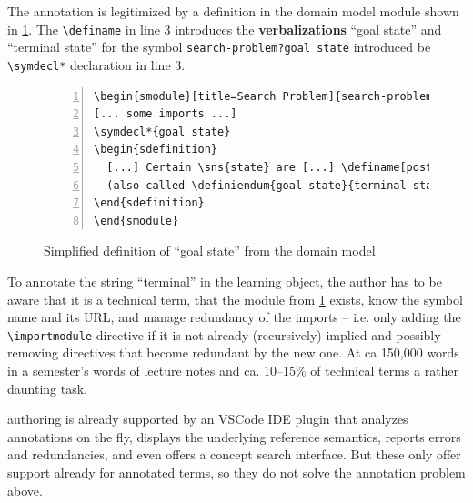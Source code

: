 \documentclass{llncs}
\def\llangle{\langle\kern-.2em\langle}
\def\rrangle{\rangle\kern-.2em\rangle}
\begin{document}
The annotation is legitimized by a definition in the domain model module shown in
\cref{fig:state-space}. The \lstinline|\definame| in line 3 introduces the
\textbf{verbalizations} ``goal state'' and ``terminal state''
for the symbol \lstinline|search-problem?goal state|
introduced be \lstinline|\symdecl*| declaration in line 3.

\begin{figure}[ht]\centering
\begin{lstlisting}[morekeywords={definame,symdecl},numbers=left]
\begin{smodule}[title=Search Problem]{search-problem}
[... some imports ...]
\symdecl*{goal state}
\begin{sdefinition}
  [...] Certain \sns{state} are [...] \definame[post=s]{goal state} [...]
  (also called \definiendum{goal state}{terminal states}).
\end{sdefinition}
\end{smodule}
\end{lstlisting}
  \caption{Simplified definition of ``goal state'' from the domain model}\label{fig:state-space}
\end{figure}

To annotate the string ``terminal'' in the learning object,
the author has to be aware that it is a technical term,
that the module from \cref{fig:state-space} exists, know the
symbol name and its URL, and manage redundancy of the imports -- i.e. only adding the
\lstinline|\importmodule| directive if it is not already (recursively) implied and
possibly removing directives that become redundant by the new one.
At ca 150,000 words in
a semester's words of lecture notes and ca. 10--15\% of technical terms a rather daunting
task.

\sTeX authoring is already supported by an VSCode IDE plugin \cite{sTeX-IDE:git} that
analyzes annotations on the fly, displays the underlying reference semantics, reports
errors and redundancies, and even offers a concept search interface. But these only offer
support already for annotated terms, so they do not solve the annotation problem above.
\end{document}
